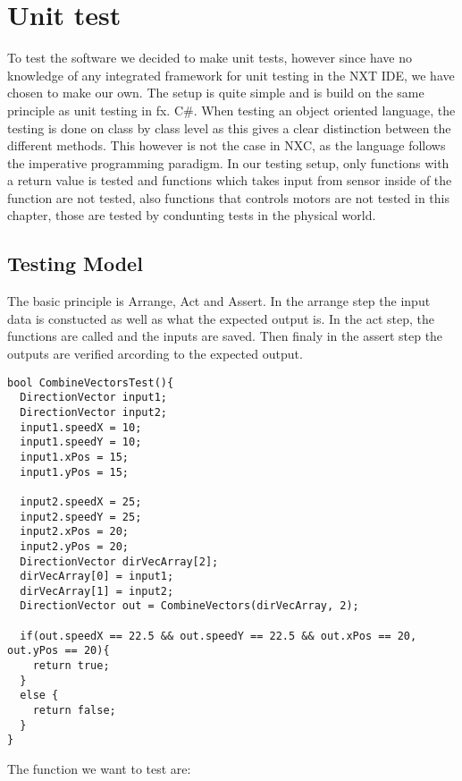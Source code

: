 \chapter{Unit test}

To test the \name software we decided to make unit tests, however since have no
knowledge of any integrated framework for unit testing in the NXT IDE, we
have chosen to make our own. The setup is quite simple and is build on the same
principle as unit testing in fx. C\#. When testing an object oriented
language, the testing is done on class by class level as this gives a clear
distinction between the different methods. This however is not the case in NXC,
as the language follows the imperative programming paradigm. In our testing
setup, only functions with a return value is tested and functions which takes input from
sensor inside of the function are not tested, also functions that controls
motors are not tested in this chapter, those are tested by condunting tests in
the physical world.

\section{Testing Model}
The basic principle is Arrange, Act and Assert. In the arrange step the input
data is constucted as well as what the expected output is. In the act step, the
functions are called and the inputs are saved. Then finaly in the assert step
the outputs are verified arcording to the expected output. \nl

\begin{minipage}[H]{\linewidth}
\begin{lstlisting}[caption =Unit Test for Combine Vectors,label=combineVectorsTest] 
bool CombineVectorsTest(){
  DirectionVector input1;
  DirectionVector input2;
  input1.speedX = 10;
  input1.speedY = 10;
  input1.xPos = 15;
  input1.yPos = 15;
  
  input2.speedX = 25;
  input2.speedY = 25;
  input2.xPos = 20;
  input2.yPos = 20;
  DirectionVector dirVecArray[2];
  dirVecArray[0] = input1;
  dirVecArray[1] = input2;
  DirectionVector out = CombineVectors(dirVecArray, 2);
  
  if(out.speedX == 22.5 && out.speedY == 22.5 && out.xPos == 20, out.yPos == 20){
    return true;
  }
  else {
    return false;
  }
}
\end{lstlisting}
\end{minipage}

The function we want to test are:

